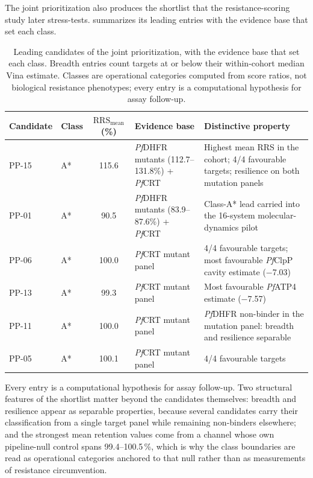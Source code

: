 The joint prioritization also produces the shortlist that the resistance-scoring study later stress-tests.  summarizes its leading entries with the evidence base that set each class.

\begin{table}[htbp]
	\centering
	\caption[Resistance-aware shortlist of the Set-C cohort]{Leading candidates of the joint prioritization, with the evidence base that set each class. Breadth entries count targets at or below their within-cohort median Vina estimate. Classes are operational categories computed from score ratios, not biological resistance phenotypes; every entry is a computational hypothesis for assay follow-up.}
	\label{tab:res_shortlist}
	\small
	\begin{tabularx}{\textwidth}{l l c X X}
		\toprule
		Candidate & Class & $\mathrm{RRS}_{\mathrm{mean}}$ (\%) & Evidence base & Distinctive property \\
		\midrule
		PP-15 & A* & \num{115.6} & \emph{Pf}DHFR mutants (\numrange{112.7}{131.8}\%) + \emph{Pf}CRT & Highest mean RRS in the cohort; \num{4}/\num{4} favourable targets; resilience on both mutation panels \\
		PP-01 & A* & \num{90.5} & \emph{Pf}DHFR mutants (\numrange{83.9}{87.6}\%) + \emph{Pf}CRT & Class-A* lead carried into the \num{16}-system molecular-dynamics pilot \\
		PP-06 & A* & \num{100.0} & \emph{Pf}CRT mutant panel & \num{4}/\num{4} favourable targets; most favourable \emph{Pf}ClpP cavity estimate (\qty{-7.03}{\kcalmol}) \\
		PP-13 & A* & \num{99.3} & \emph{Pf}CRT mutant panel & Most favourable \emph{Pf}ATP4 estimate (\qty{-7.57}{\kcalmol}) \\
		PP-11 & A* & \num{100.0} & \emph{Pf}CRT mutant panel & \emph{Pf}DHFR non-binder in the mutation panel: breadth and resilience separable \\
		PP-05 & A* & \num{100.1} & \emph{Pf}CRT mutant panel & \num{4}/\num{4} favourable targets \\
		\bottomrule
	\end{tabularx}
\end{table}

Every entry is a computational hypothesis for assay follow-up. Two structural features of the shortlist matter beyond the candidates themselves: breadth and resilience appear as separable properties, because several candidates carry their classification from a single target panel while remaining non-binders elsewhere; and the strongest mean retention values come from a channel whose own pipeline-null control spans \numrange{99.4}{100.5}\,\%, which is why the class boundaries are read as operational categories anchored to that null rather than as measurements of resistance circumvention.

